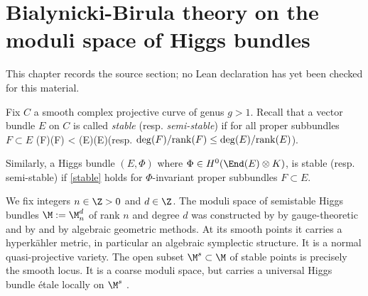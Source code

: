 \chapter{Bialynicki-Birula theory on the moduli space of Higgs bundles}
\label{very-stable-higgs-bundles-equivariant-multiplicity-mirror-symmetry-chapter-03}

\begin{remark}
\label{very-stable-higgs-bundles-equivariant-multiplicity-mirror-symmetry-chapter-03-source}
This chapter records the source section; no Lean declaration has yet been checked for this material.
\notready
\end{remark}

\label{bbhiggs}


Fix $C$ a smooth complex projective curve of genus $g>1$.
Recall that a vector bundle $E$ on $C$ is called
{\em stable} (resp. {\em semi-stable}) %
if for all proper subbundles $F\subset E$ \beq \label{stable}{\deg(F)(F)}
< {\deg(E)(E)}\eeq (resp. ${\deg(F)/ {\rm rank}(F)}
\leq {\deg(E)/ {\rm rank}(E)}$).

Similarly, a Higgs bundle $(E,\Phi)$ where $\Phi\in H^0(\End(E)\otimes K)$, is stable (resp. semi-stable) if \eqref{stable} holds for $\Phi$-invariant proper subbundles $F\subset E$.

We fix integers $n\in \Z>0$ and $d\in \Z$.	The moduli space of semistable Higgs bundles $\M:=\M_{n}^{d}$ of rank $n$ and degree $d$ was constructed by \cite{hitchin} by gauge-theoretic and by \cite{nitsure} and \cite{simpson1} by algebraic geometric methods.  At its smooth points it carries a hyperk\"ahler metric, in particular an algebraic symplectic structure. It is  a normal \cite[Corollary 11.7]{simpson1b} quasi-projective variety. The open subset $\M^s\subset \M$ of stable points is precisely the smooth locus.  It is a coarse moduli space, but carries a universal Higgs bundle  \'etale locally on $\M^s$ \cite[Theorem 4.5.(4)]{simpson1}.


